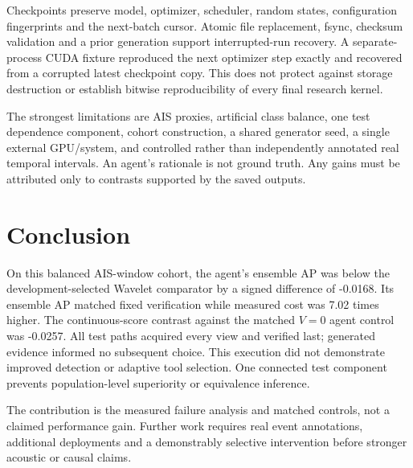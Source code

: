 \documentclass[11pt,letterpaper]{article}
\begin{document}
Checkpoints preserve model, optimizer, scheduler, random states, configuration fingerprints and the next-batch cursor. Atomic file replacement, fsync, checksum validation and a prior generation support interrupted-run recovery. A separate-process CUDA fixture reproduced the next optimizer step exactly and recovered from a corrupted latest checkpoint copy. This does not protect against storage destruction or establish bitwise reproducibility of every final research kernel.\par

The strongest limitations are AIS proxies, artificial class balance, one test dependence component, cohort construction, a shared generator seed, a single external GPU/system, and controlled rather than independently annotated real temporal intervals. An agent's rationale is not ground truth. Any gains must be attributed only to contrasts supported by the saved outputs.\par

\clearpage

\section{Conclusion}

On this balanced AIS-window cohort, the agent's ensemble AP was below the development-selected Wavelet comparator by a signed difference of -0.0168. Its ensemble AP matched fixed verification while measured cost was 7.02 times higher. The continuous-score contrast against the matched \(V=0\) agent control was -0.0257. All test paths acquired every view and verified last; generated evidence informed no subsequent choice. This execution did not demonstrate improved detection or adaptive tool selection. One connected test component prevents population-level superiority or equivalence inference.\par

The contribution is the measured failure analysis and matched controls, not a claimed performance gain. Further work requires real event annotations, additional deployments and a demonstrably selective intervention before stronger acoustic or causal claims.\par

{\fontsize{9}{11}\selectfont





}
\end{document}
